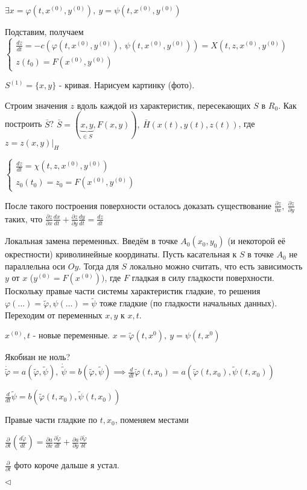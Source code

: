 \documentclass[12pt, a4paper]{article}
\begin{document}
    $\exists x = \varphi(t, x^{(0)}, y^{(0)}),\ y = \psi(t, x^{(0)}, y^{(0)})$

    Подставим, получаем $\begin{cases}
        \frac{dz}{dt} = -c(\varphi(t,x^{(0)},y^{(0)}),\ \psi(t, x^{(0)}, y^{(0)})) = X(t, z, x^{(0)}, y^{(0)}) \\
        z(t_0) = F(x^{(0)}, y^{(0)})
    \end{cases}$

    $S^{(1)} = \{x, y\}$ - кривая. Нарисуем картинку (фото). %

    Строим значения $z$ вдоль каждой из характеристик, пересекающих $S$ в $R_0$. Как построить $\bar S$? $\bar S = (\underbrace{x, y}_{\in S}, F(x,y)),\ \bar H (x(t), y(t), z(t))$, где $z = z(x,y)|_H$

    $\begin{cases}
        \frac{dz}{dt} = \chi(t,z,x^{(0)},y^{(0)}) \\ 
        z_0(t_0) = z_0 = F(x^{(0)},y^{(0)})
    \end{cases}$

    После такого построения поверхности осталось доказать существование $\frac{\partial z}{\partial x},\ \frac{\partial z}{\partial y}$ таких, что $\frac{\partial z}{\partial x}\frac{dx}{dt} + \frac{\partial z}{\partial y}\frac{dy}{dt} = \frac{dz}{dt}$

    Локальная замена переменных. Введём в точке $A_0(x_0, y_0)$ (и некоторой её окрестности) криволинейные координаты. Пусть касательная к $S$ в точке $A_0$ не параллельна оси $Oy$. Тогда для $S$ локально можно считать, что есть зависимость $y$ от $x$ ($y^{(0)} = F(x^{(0)}))$, где $F$ гладкая в силу гладкости поверхности. Поскольку правые части системы характеристик гладкие, то решения $\varphi(\dotsc) = \widetilde{ \varphi}, \psi(\dotsc)= \widetilde{\psi}$ тоже гладкие (по гладкости начальных данных). Переходим от переменных $x,y$ к $x,t$.

    $x^{(0)}, t$ - новые переменные. $x = \widetilde{\varphi}(t,x^0),\ y=\psi(t, x^0)$

    Якобиан не ноль? $\dot{\widetilde{\varphi}}=a(\widetilde{\varphi}, \widetilde{\psi}),\ \dot{\widetilde{\psi}} = b(\widetilde{\varphi}, \widetilde{\psi}) \implies \frac{d}{dt}\widetilde{\varphi}(t,x_0) = a(\widetilde{\varphi}(t,x_0), \widetilde{\psi}(t,x_0))$

    $\frac{d}{dt}\widetilde{\psi} = b(\widetilde{\varphi}(t,x_0), \widetilde{\psi}(t,x_0))$ %

    Правые части гладкие по $t, x_0$, поменяем местами 

    $\frac{\partial}{\partial t}(\frac{d\widetilde{\varphi}}{dt}) = \frac{\partial a}{\partial x}\frac{\partial \widetilde{\varphi}}{dt} + \frac{\partial a}{\partial y}\frac{\partial \widetilde{\varphi}}{\delta t}$

    $\frac{\partial}{\partial t}$ фото короче дальше я устал.

    $\triangleleft$
\end{document}
